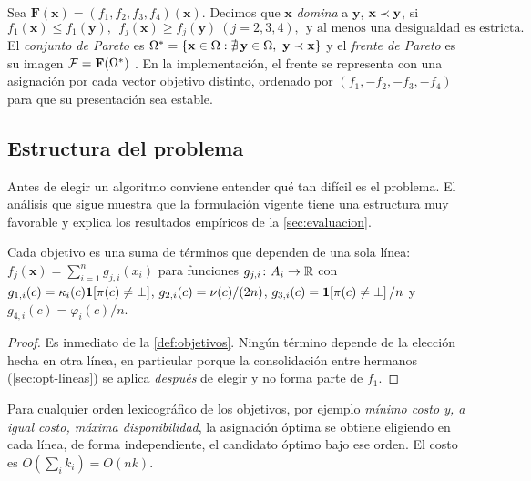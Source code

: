 \begin{definicion}
\label{def:dominancia}
Sea $\mathbf{F}(\mathbf{x})=(f_1,f_2,f_3,f_4)(\mathbf{x})$. Decimos que
$\mathbf{x}$ \emph{domina} a $\mathbf{y}$, $\mathbf{x}\prec\mathbf{y}$, si
\[
  f_1(\mathbf{x})\leq f_1(\mathbf{y}),\ \ f_j(\mathbf{x})\geq f_j(\mathbf{y})\ (j=2,3,4),
  \ \ \text{y al menos una desigualdad es estricta.}
\]
El \emph{conjunto de Pareto} es $\Esp^\ast=\{\mathbf{x}\in\Esp:\nexists\,\mathbf{y}\in\Esp,\ \mathbf{y}\domina\mathbf{x}\}$
y el \emph{frente de Pareto} es su imagen $\mathcal{F}=\mathbf{F}(\Omega^\ast)$
\cite{miettinen1999,ehrgott2005}. En la implementación, el frente se representa
con una asignación por cada vector objetivo distinto, ordenado por
$(f_1,-f_2,-f_3,-f_4)$ para que su presentación sea estable.
\end{definicion}

\subsection{Estructura del problema}
\label{sec:opt-estructura}

Antes de elegir un algoritmo conviene entender qué tan difícil es el
problema. El análisis que sigue muestra que la formulación vigente tiene una
estructura muy favorable y explica los resultados empíricos de la
\cref{sec:evaluacion}.

\begin{proposicion}
\label{prop:separable}
Cada objetivo es una suma de términos que dependen de una sola línea:
$f_j(\mathbf{x})=\sum_{i=1}^n g_{j,i}(x_i)$ para funciones
$g_{j,i}\colon A_i\to\mathbb{R}$ con
$g_{1,i}(c)=\kappa_i(c)\mathbf{1}\!\left[\pi(c)\neq\bot\right]$,
$g_{2,i}(c)=\nu(c)/(2n)$, $g_{3,i}(c)=\mathbf{1}\!\left[\pi(c)\neq\bot\right]/n$ y
$g_{4,i}(c)=\varphi_i(c)/n$.
\end{proposicion}

\begin{proof}
Es inmediato de la \cref{def:objetivos}. Ningún término depende de la
elección hecha en otra línea, en particular porque la consolidación entre
hermanos (\cref{sec:opt-lineas}) se aplica \emph{después} de elegir y no forma
parte de $f_1$.
\end{proof}

\begin{corolario}
\label{cor:extremos}
Para cualquier orden lexicográfico de los objetivos, por ejemplo
\emph{mínimo costo y, a igual costo, máxima disponibilidad}, la asignación
óptima se obtiene eligiendo en cada línea, de forma independiente, el
candidato óptimo bajo ese orden. El costo es $O(\sum_i k_i)=O(nk)$.
\end{corolario}

